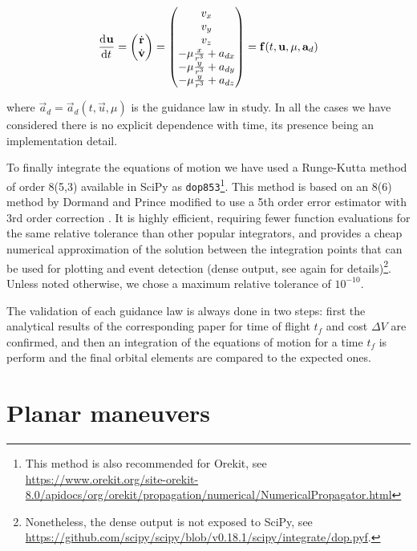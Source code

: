 \begin{equation}
\frac{\operatorname{d}\!^{} \mathbf{u}}{\operatorname{d}\! t^{}} = \begin{pmatrix} \dot{\mathbf{r}} \\ \dot{\mathbf{v}} \end{pmatrix} = \begin{pmatrix} v_x \\ v_y \\ v_z \\ -\mu \frac{x}{r^3} + a_{dx} \\ -\mu \frac{y}{r^3} + a_{dy} \\ -\mu \frac{y}{r^3} + a_{dz} \end{pmatrix} = \mathbf{f}(t, \mathbf{u}, \mu, \mathbf{a}_d)
\end{equation}

where $\vec{a}_d = \vec{a}_d(t, \vec{u}, \mu)$ is the guidance law in study. In all the cases we have considered there is no explicit dependence with time, its presence being an implementation detail.

To finally integrate the equations of motion we have used a Runge-Kutta method of order 8(5,3) available in SciPy as \verb|dop853|\footnote{This method is also recommended for Orekit, see \url{https://www.orekit.org/site-orekit-8.0/apidocs/org/orekit/propagation/numerical/NumericalPropagator.html}}. This method is based on an 8(6) method by Dormand and Prince modified to use a 5th order error estimator with 3rd order correction \cite{hairer1993solving}. It is highly efficient, requiring fewer function evaluations for the same relative tolerance than other popular integrators, and provides a cheap numerical approximation of the solution between the integration points that can be used for plotting and event detection (dense output, see again \cite{hairer1993solving} for details)\footnote{Nonetheless, the dense output is not exposed to SciPy, see \url{https://github.com/scipy/scipy/blob/v0.18.1/scipy/integrate/dop.pyf}.}. Unless noted otherwise, we chose a maximum relative tolerance of $10^{-10}$.

The validation of each guidance law is always done in two steps: first the analytical results of the corresponding paper for time of flight $t_f$ and cost $\Delta V$ are confirmed, and then an integration of the equations of motion for a time $t_f$ is perform and the final orbital elements are compared to the expected ones.

\section{Planar maneuvers} \label{sec:metplanar}

